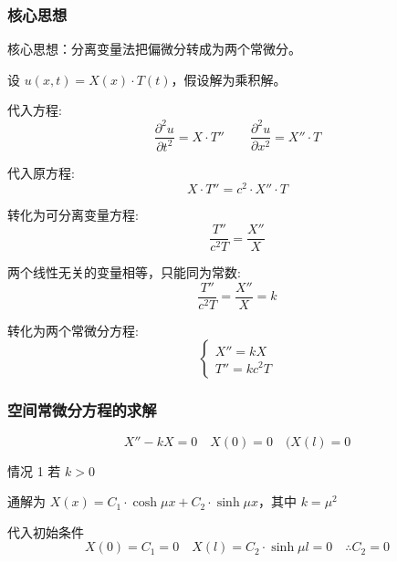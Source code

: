 \documentclass[12pt,a4paper]{article}
\numberwithin{subsection}{section}   %
\numberwithin{subsubsection}{subsection}
\theoremstyle{plain}
\theoremstyle{definition}
\theoremstyle{remark}
\theoremstyle{remark}
\begin{document}
	\subsubsection{核心思想}
	核心思想：分离变量法把偏微分转成为两个常微分。
	
	设 \(u(x, t) = X(x) \cdot T(t)\)，假设解为乘积解。
	
	代入方程:
	\begin{equation} \label{eq:substitution}
		\frac{\partial^2 u}{\partial t^2} = X \cdot T'' \qquad \frac{\partial^2 u}{\partial x^2} = X'' \cdot T
	\end{equation}
	
	代入原方程:
	\begin{equation} \label{eq:original_substitution}
		X \cdot T'' = c^2 \cdot X'' \cdot T
	\end{equation}
	
	转化为可分离变量方程:
	\begin{equation} \label{eq:separation}
		\frac{T''}{c^2 T} = \frac{X''}{X}
	\end{equation}
	
	两个线性无关的变量相等，只能同为常数:
	\begin{equation} \label{eq:constant}
		\frac{T''}{c^2 T} = \frac{X''}{X} = k
	\end{equation}
	
	转化为两个常微分方程:
	\begin{equation} \label{eq:ode}
		\begin{cases}
			X'' = kX \\
			T'' = k c^2 T
		\end{cases}
	\end{equation}
	
	\subsubsection{空间常微分方程的求解}
	\begin{equation}
		X'' - kX = 0 \quad X(0) = 0 \quad (X(l) = 0
	\end{equation}
	
情况 1 \quad 若 \(k > 0\)

通解为 \(X(x) = C_1 \cdot \cosh \mu x + C_2 \cdot \sinh \mu x\)，其中 \(k = \mu^2\)
	
	代入初始条件 
	\begin{equation}
		X(0) = C_1 = 0 \quad X(l) = C_2 \cdot \sinh \mu l = 0 \quad \therefore C_2 = 0
	\end{equation}
	
\end{document}
